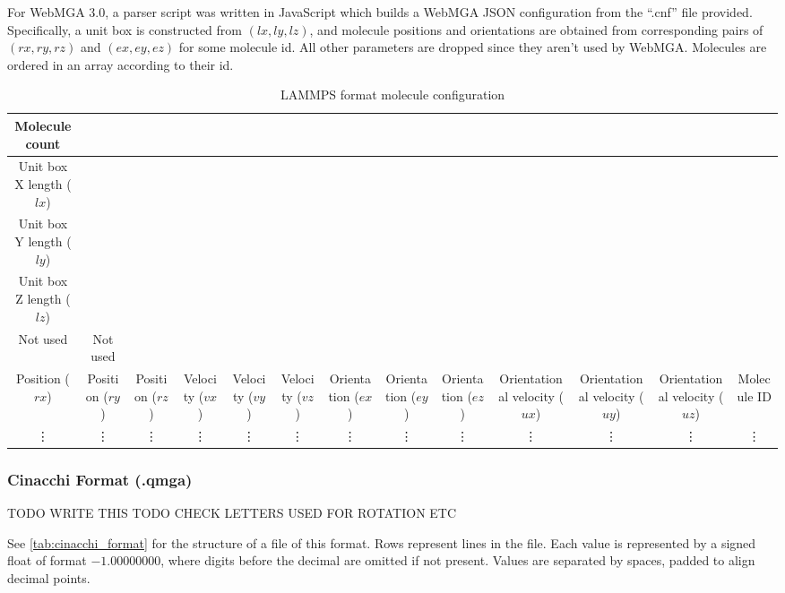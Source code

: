 For WebMGA 3.0, a parser script was written in JavaScript which builds a WebMGA JSON configuration from the ``.cnf'' file provided. Specifically, a unit box is constructed from $(lx, ly, lz)$, and molecule positions and orientations are obtained from corresponding pairs of $(rx,ry,rz)$ and $(ex,ey,ez)$ for some molecule id. All other parameters are dropped since they aren't used by WebMGA. Molecules are ordered in an array according to their id.
\begin{table}
  \begin{center}
  \begin{adjustbox}{width=\textwidth}
    \begin{tabular}{|c|c|c|c|c|c|c|c|c|c|c|c|c|}
      \hline
      Molecule count & & & & & & & & & & & &\\
      \hline
      Unit box X length ($lx$) & & & & & & & & & & & &\\
      \hline
      Unit box Y length ($ly$) & & & & & & & & & & & &\\
      \hline
      Unit box Z length ($lz$) & & & & & & & & & & & &\\
      \hline
      Not used & Not used & & & & & & & & & & &\\
      \hline
      Position ($rx$) & Position ($ry$) & Position ($rz$) & Velocity ($vx$) & Velocity ($vy$) & Velocity ($vz$) & Orientation ($ex$) & Orientation ($ey$) & Orientation ($ez$) & Orientational velocity ($ux$) & Orientational velocity ($uy$) & Orientational velocity ($uz$) & Molecule ID\\
      \hline
      \vdots & \vdots & \vdots & \vdots & \vdots & \vdots & \vdots & \vdots & \vdots & \vdots & \vdots & \vdots & \vdots \\
       \hline
    \end{tabular}
  \end{adjustbox}
  \end{center}
  \caption{LAMMPS format molecule configuration}
  \label{tab:lammps_format}
\end{table}

\subsubsection{Cinacchi Format (.qmga)}
TODO WRITE THIS
TODO CHECK LETTERS USED FOR ROTATION ETC

See \cref{tab:cinacchi_format} for the structure of a file of this format. Rows represent lines in the file. Each value is represented by a signed float of format $-1.00000000$, where digits before the decimal are omitted if not present. Values are separated by spaces, padded to align decimal points.

